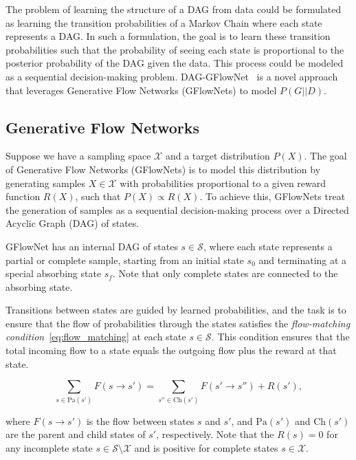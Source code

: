 \documentclass{lxaiproposal}
\begin{document}
    The problem of learning the structure of a DAG from data could be formulated as learning the transition probabilities
    of a Markov Chain where each state represents a DAG. In such a formulation, the goal is to learn these
    transition probabilities such that the probability of seeing each state is proportional to the posterior probability
    of the DAG given the data. This process could be modeled as a sequential decision-making problem.
    DAG-GFlowNet~\cite{deleu2022daggflownet} is a novel approach that leverages Generative Flow Networks (GFlowNets) to
    model $P(G|\mid D)$.

    \subsection{Generative Flow Networks}
    \vspace*{-3mm}

    Suppose we have a sampling space $\mathcal{X}$ and a target distribution $P(X)$. The goal of Generative Flow
    Networks (GFlowNets) is to model this distribution by generating samples $X \in \mathcal{X}$ with probabilities
    proportional to a given reward function $R(X)$, such that $P(X) \propto R(X)$. To achieve this, GFlowNets treat
    the generation of samples as a sequential decision-making process over a Directed Acyclic Graph (DAG) of states.

    GFlowNet has an internal DAG of states $s \in \mathcal{S}$, where each state represents a partial or complete
    sample, starting from an initial state $s_0$ and terminating at a special absorbing state $s_f$. Note that only
    complete states are connected to the absorbing state.

    Transitions between states are guided by learned
    probabilities, and the task is to ensure that the flow of probabilities through the states satisfies the
    \textit{flow-matching condition}~\eqref{eq:flow_matching} at each state $s \in \mathcal{S}$. This condition
    ensures that the total incoming flow to a state equals the outgoing flow plus the reward at that state.

    \begin{equation}
        \sum_{s \in \text{Pa}(s')} F(s \to s') = \sum_{s'' \in \text{Ch}(s')} F(s' \to s'') + R(s'),
        \label{eq:flow_matching}
    \end{equation}

    where $F(s \to s')$ is the flow between states $s$ and $s'$, and $\text{Pa}(s')$ and $\text{Ch}(s')$ are the
    parent and child states of $s'$, respectively. Note that the $R(s) = 0$ for any incomplete state
    $s \in \mathcal{S}\setminus\mathcal{X}$ and is positive for complete states $s \in \mathcal{X}$.
\end{document}
